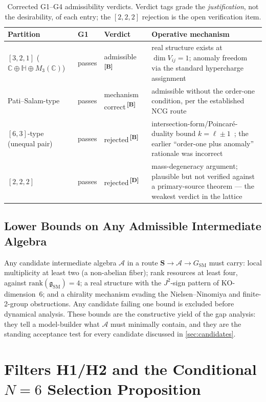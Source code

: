 \documentclass[12pt,a4paper,twoside]{article}
\theoremstyle{plain}
\theoremstyle{definition}
\theoremstyle{remark}
\newcommand{\catmark}[1]{\textsuperscript{\textsf{\textbf{[#1]}}}}
\begin{document}
\begin{table}[H]
\centering\footnotesize
\begin{tabular}{@{}lllp{5.1cm}@{}}
\toprule
Partition & G1 & Verdict & Operative mechanism \\
\midrule
$[3,2,1]$ ($\mathbb C\oplus\mathbb H\oplus M_3(\mathbb C)$) & passes &
admissible\,\catmark{B} & real structure exists at $\dim V_{ij}=1$;
anomaly freedom via the standard hypercharge assignment \\
Pati--Salam-type & passes & mechanism correct\,\catmark{B} & admissible
without the order-one condition, per the established NCG route~\cite{ccvs2013,ccm2015} \\
$[6,3]$-type (unequal pair) & passes & rejected\,\catmark{B} &
intersection-form/Poincar\'e-duality bound $k=\ell\pm1$~\cite{iss2004}; the earlier
``order-one plus anomaly'' rationale was incorrect \\
$[2,2,2]$ & passes & rejected\,\catmark{D} & mass-degeneracy argument;
plausible but not verified against a primary-source theorem --- the
weakest verdict in the lattice \\
\bottomrule
\end{tabular}
\caption{Corrected G1--G4 admissibility verdicts. Verdict tags grade the
\emph{justification}, not the desirability, of each entry; the
$[2,2,2]$ rejection is the open verification item.}
\label{tab:lattice}
\end{table}

\subsection{Lower Bounds on Any Admissible Intermediate Algebra}
\label{subsec:lower-bounds}

Any candidate intermediate algebra $\mathcal A$ in a route
$\mathbf S \to \mathcal A \to G_{\mathrm{SM}}$ must carry: local
multiplicity at least two (a non-abelian fiber); rank resources at least
four, against $\mathrm{rank}(\mathfrak g_{\mathrm{SM}}) = 4$; a real
structure with the $J^2$-sign pattern of KO-dimension~6; and a chirality
mechanism evading the Nielsen--Ninomiya and finite-2-group obstructions.
Any candidate failing one bound is excluded before dynamical analysis.
These bounds are the constructive yield of the gap analysis: they tell a
model-builder what $\mathcal A$ must minimally contain, and they are the
standing acceptance test for every candidate discussed in
\cref{sec:candidates}.

\section{Filters H1/H2 and the Conditional $N=6$ Selection Proposition}
\label{sec:selection}
\end{document}
